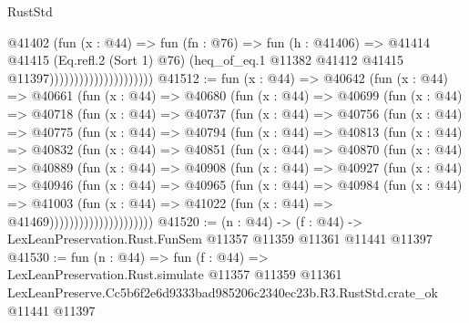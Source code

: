 \begin{lexlean}{RustStd}
\begin{coremodule}
                                        @41402
                                          (fun (x : @44) =>
                                          fun (fn : @76) =>
                                          fun (h : @41406) =>
                                          @41414
                                            @41415
                                            (Eq.refl.{2} (Sort 1) @76)
                                            (heq_of_eq.{1}
                                              @11382
                                              @41412
                                              @41415
                                              @11397)))))))))))))))))))))
@41512 := fun (x : @44) =>
  @40642
    (fun (x : @44) =>
    @40661
      (fun (x : @44) =>
      @40680
        (fun (x : @44) =>
        @40699
          (fun (x : @44) =>
          @40718
            (fun (x : @44) =>
            @40737
              (fun (x : @44) =>
              @40756
                (fun (x : @44) =>
                @40775
                  (fun (x : @44) =>
                  @40794
                    (fun (x : @44) =>
                    @40813
                      (fun (x : @44) =>
                      @40832
                        (fun (x : @44) =>
                        @40851
                          (fun (x : @44) =>
                          @40870
                            (fun (x : @44) =>
                            @40889
                              (fun (x : @44) =>
                              @40908
                                (fun (x : @44) =>
                                @40927
                                  (fun (x : @44) =>
                                  @40946
                                    (fun (x : @44) =>
                                    @40965
                                      (fun (x : @44) =>
                                      @40984
                                        (fun (x : @44) =>
                                        @41003
                                          (fun (x : @44) =>
                                          @41022 (fun (x : @44) => @41469)))))))))))))))))))))
@41520 := (n : @44) ->
  (f : @44) -> LexLeanPreservation.Rust.FunSem @11357 @11359 @11361 @11441 @11397
@41530 := fun (n : @44) =>
  fun (f : @44) =>
  LexLeanPreservation.Rust.simulate
    @11357
    @11359
    @11361
    LexLeanPreserve.Cc5b6f2e6d9333bad985206c2340ec23b.R3.RustStd.crate_ok
    @11441
    @11397
\end{coremodule}
\end{lexlean}
